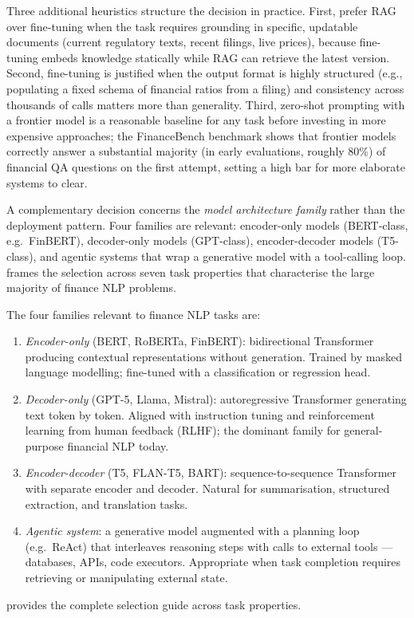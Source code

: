 \begin{context}

Three additional heuristics structure the decision in practice. First, prefer RAG over fine-tuning when the task requires grounding in specific, updatable documents (current regulatory texts, recent filings, live prices), because fine-tuning embeds knowledge statically while RAG can retrieve the latest version. Second, fine-tuning is justified when the output format is highly structured (e.g., populating a fixed schema of financial ratios from a filing) and consistency across thousands of calls matters more than generality. Third, zero-shot prompting with a frontier model is a reasonable baseline for any task before investing in more expensive approaches; the FinanceBench benchmark \cite{zhang2024financebench} shows that frontier models correctly answer a substantial majority (in early evaluations, roughly 80\%) of financial QA questions on the first attempt, setting a high bar for more elaborate systems to clear.

A complementary decision concerns the \emph{model architecture family} rather than the deployment pattern. Four families are relevant: encoder-only models (BERT-class, e.g.\ FinBERT), decoder-only models (GPT-class), encoder-decoder models (T5-class), and agentic systems that wrap a generative model with a tool-calling loop.  frames the selection across seven task properties that characterise the large majority of finance NLP problems.

\begin{definition}
\label{def:arch-families}
The four families relevant to finance NLP tasks are:
\begin{enumerate}
  \item \emph{Encoder-only} (BERT, RoBERTa, FinBERT): bidirectional Transformer producing contextual representations without generation. Trained by masked language modelling; fine-tuned with a classification or regression head.
  \item \emph{Decoder-only} (GPT-5, Llama, Mistral): autoregressive Transformer generating text token by token. Aligned with instruction tuning and reinforcement learning from human feedback (RLHF); the dominant family for general-purpose financial NLP today.
  \item \emph{Encoder-decoder} (T5, FLAN-T5, BART): sequence-to-sequence Transformer with separate encoder and decoder. Natural for summarisation, structured extraction, and translation tasks.
  \item \emph{Agentic system}: a generative model augmented with a planning loop (e.g.\ ReAct) that interleaves reasoning steps with calls to external tools — databases, APIs, code executors. Appropriate when task completion requires retrieving or manipulating external state.
\end{enumerate}
\end{definition}

 provides the complete selection guide across task properties.

\end{context}

